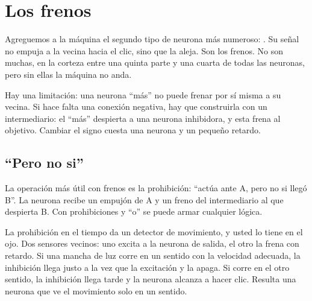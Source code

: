 \chapter{Los frenos}

Agreguemos a la máquina el segundo tipo de neurona más numeroso: . Su señal no empuja a la vecina hacia el clic, sino que la aleja. Son los frenos. No son muchas, en la corteza entre una quinta parte y una cuarta de todas las neuronas, pero sin ellas la máquina no anda.

Hay una limitación: una neurona “más” no puede frenar por sí misma a su vecina. Si hace falta una conexión negativa, hay que construirla con un intermediario: el “más” despierta a una neurona inhibidora, y esta frena al objetivo. Cambiar el signo cuesta una neurona y un pequeño retardo.

\section*{“Pero no si”}

La operación más útil con frenos es la prohibición: “actúa ante A, pero no si llegó B”. La neurona recibe un empujón de A y un freno del intermediario al que despierta B. Con prohibiciones y “o” se puede armar cualquier lógica.


La prohibición en el tiempo da un detector de movimiento, y usted lo tiene en el ojo. Dos sensores vecinos: uno excita a la neurona de salida, el otro la frena con retardo. Si una mancha de luz corre en un sentido con la velocidad adecuada, la inhibición llega justo a la vez que la excitación y la apaga. Si corre en el otro sentido, la inhibición llega tarde y la neurona alcanza a hacer clic. Resulta una neurona que ve el movimiento solo en un sentido.

